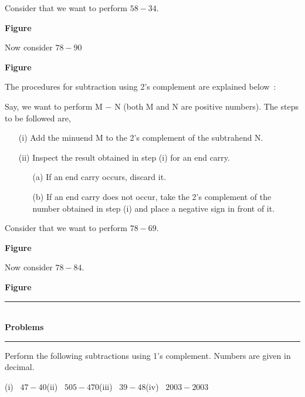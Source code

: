 Consider that we want to perform $58-34$.
\begin{center}
{\bf Figure}
\end{center}

Now consider $78-90$
\begin{center}
{\bf Figure}
\end{center}


The procedures for subtraction using 2's complement are explained below~:

Say, we want to perform M $-$ N (both M and N are positive numbers). The steps to be followed are,
\begin{itemize}
\item[(i)] Add the minuend M to the 2's complement of the subtrahend N.

\item[(ii)] Inspect the result obtained in step (i) for an end carry.
\begin{itemize}
\item[(a)] If an end carry occurs, discard it.

\item[(b)] If an end carry does not occur, take the 2's complement of the number obtained in step (i) and place a negative sign in front of it.
\end{itemize}
\end{itemize}

Consider that we want to perform $78-69$.
\begin{center}
{\bf Figure}
\end{center}

Now consider $78-84$.
\begin{center}
{\bf Figure}
\end{center}

\begin{center}
\rule{4cm}{1pt}\\
{\bf\Large Problems}\\[-3pt]
\rule{4cm}{1pt}
\end{center}

\begin{problem}\label{prob5.28}
Perform the following subtractions using 1's complement. Numbers are given in decimal.

\smallskip
(i)~ $47-40$\hfil (ii)~ $505-470$\hfil (iii)~ $39-48$\hfil (iv)~ $2003-2003$
\end{problem}

